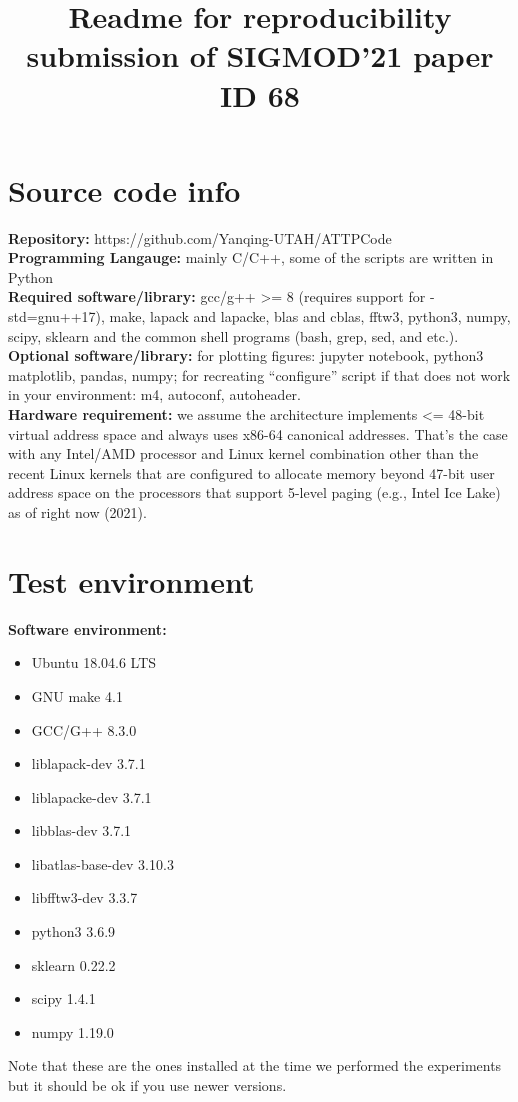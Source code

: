 \documentclass[11pt]{article}
\title{Readme for reproducibility submission of SIGMOD'21 paper ID 68}
\author{}
\date{}
\newenvironment{pkl}{%
\begin{itemize}%
\setlength\itemsep{-0.5\parskip}%
\setlength\parsep{0in}%
}{%
\end{itemize}}
\begin{document}
\maketitle

\section{Source code info}

{\bf Repository:} https://github.com/Yanqing-UTAH/ATTPCode\\
{\bf Programming Langauge:} mainly C/C++, some of the scripts are written in
Python\\
{\bf Required software/library:} gcc/g++ >= 8 (requires support for
-std=gnu++17), make, lapack and lapacke, blas and cblas, fftw3,
python3, numpy, scipy, sklearn and the common shell programs (bash,
grep, sed, and etc.).\\
{\bf Optional software/library:} for plotting figures: jupyter
notebook, python3
matplotlib, pandas, numpy; for recreating ``configure'' script if that
does not work in your environment: m4, autoconf, autoheader.  \\
{\bf Hardware requirement:} we assume the architecture implements <= 48-bit
virtual address space and always uses x86-64 canonical addresses.
That's the case with any Intel/AMD processor and Linux kernel
combination other than the recent Linux kernels that are configured to
allocate memory beyond 47-bit user address space on the processors
that support 5-level paging (e.g., Intel Ice Lake) as of right now
(2021). 

\section{Test environment}
{\bf Software environment:}
\begin{pkl}
	\item Ubuntu 18.04.6 LTS
    \item GNU make 4.1
	\item GCC/G++ 8.3.0
	\item liblapack-dev 3.7.1
	\item liblapacke-dev 3.7.1
	\item libblas-dev 3.7.1
	\item libatlas-base-dev 3.10.3
	\item libfftw3-dev 3.3.7
    \item python3 3.6.9
    \item sklearn 0.22.2
    \item scipy 1.4.1
    \item numpy 1.19.0
\end{pkl}
Note that these are the ones installed at the
time we performed the experiments but it should be ok if you use newer
versions. 
\end{document}
